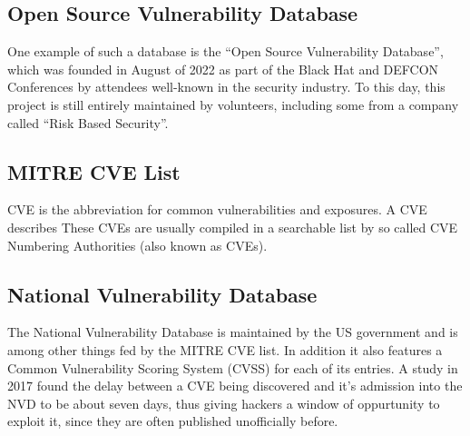 \subsection{Open Source Vulnerability Database}
One example of such a database is the ``Open Source Vulnerability Database'', which was founded in August of 2022 as part of the Black Hat and DEFCON Conferences by attendees well-known in the security industry.
To this day, this project is still entirely maintained by volunteers, including some from a company called ``Risk Based Security''.
\subsection{MITRE CVE List}
CVE is the abbreviation for common vulnerabilities and exposures. A CVE describes 
These CVEs are usually compiled in a searchable list by so called CVE Numbering Authorities (also known as CVEs).
\subsection{National Vulnerability Database}
The National Vulnerability Database is maintained by the US government and is among other things fed by the MITRE CVE list. In addition it also features a Common Vulnerability Scoring System (CVSS) for each of its entries. A study in 2017 found the delay between a CVE being discovered and it's admission into the NVD to be about seven days, thus giving hackers a window of oppurtunity to exploit it, since they are often published unofficially before.

